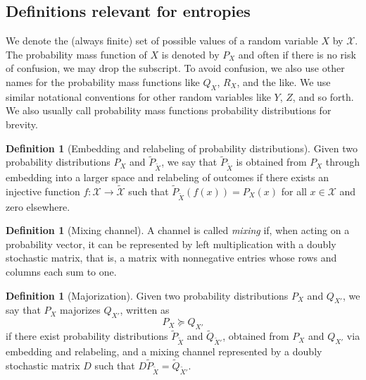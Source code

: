 \documentclass[aps,pra,11pt,onecolumn,nofootinbib,tightenlines]{revtex4-2}
\theoremstyle{definition}
\newtheorem{definition}[theorem]{Definition}
\newcommand{\mc}[1]{\mathcal{#1}}
\begin{document}
\subsection{Definitions relevant for entropies}

We denote the (always finite) set of possible values of a random variable $X$ by $\mc X$. The probability mass function of $X$ is denoted by $P_X$ and often if there is no risk of confusion, we may drop the subscript. To avoid confusion, we also use other names for the probability mass functions like $Q_X$, $R_X$, and the like. We use similar notational conventions for other random variables like $Y$, $Z$, and so forth. We also usually call probability mass functions probability distributions for brevity.

\begin{definition}[Embedding and relabeling of probability distributions]
Given two probability distributions \(P_{X}\) and \(\widetilde{P}_{\widetilde{X}}\), we say that \(\widetilde{P}_{\widetilde{X}}\) is obtained from \(P_{X}\) through embedding into a larger space and relabeling of outcomes if there exists an injective function \( f : \mathcal{X} \to \widetilde{\mathcal{X}} \) such that  $\widetilde{P}_{\widetilde{X}}(f(x)) = P_X(x)$
for all $x \in \mathcal{X}$
and zero elsewhere.
\end{definition}

\begin{definition}[Mixing channel]
A channel is called \emph{mixing} if, when acting on a probability vector, it can be represented by left multiplication with a doubly stochastic matrix, that is, a matrix with nonnegative entries whose rows and columns each sum to one.
\end{definition}


\begin{definition}[Majorization]
Given two probability distributions $P_X$ and $Q_{X'}$, we say that $P_X$ majorizes $Q_{X'}$, written as
\begin{equation}
    P_X \succeq Q_{X'}
\end{equation}
if there exist probability distributions \(\widetilde{P}_{\widetilde{X}}\) and \(\widetilde{Q}_{\widetilde{X}'}\), obtained from \(P_X\) and \(Q_{X'}\) via embedding and relabeling, and a mixing channel represented by a doubly stochastic matrix \(D\) such that $D \widetilde{P}_{\widetilde{X}} = \widetilde{Q}_{\widetilde{X}'}$.
\end{definition}
\end{document}
